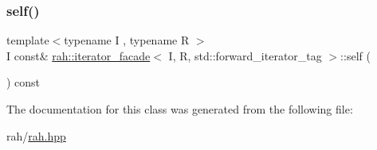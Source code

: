 \subsubsection{\texorpdfstring{self()}{self()}\hspace{0.1cm}{\footnotesize\ttfamily [2/2]}}
{\footnotesize\ttfamily template$<$typename I , typename R $>$ \\
I const\& \mbox{\hyperlink{structrah_1_1iterator__facade}{rah\+::iterator\+\_\+facade}}$<$ I, R, std\+::forward\+\_\+iterator\+\_\+tag $>$\+::self (\begin{DoxyParamCaption}{ }\end{DoxyParamCaption}) const\hspace{0.3cm}{\ttfamily [inline]}}



The documentation for this class was generated from the following file\+:\begin{DoxyCompactItemize}
\item 
rah/\mbox{\hyperlink{rah_8hpp}{rah.\+hpp}}\end{DoxyCompactItemize}
